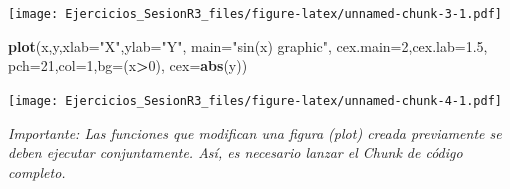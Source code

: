 \documentclass[
]{article}
\newenvironment{Shaded}{\begin{snugshade}}{\end{snugshade}}
\newcommand{\DataTypeTok}[1]{\textcolor[rgb]{0.13,0.29,0.53}{#1}}
\newcommand{\DecValTok}[1]{\textcolor[rgb]{0.00,0.00,0.81}{#1}}
\newcommand{\FloatTok}[1]{\textcolor[rgb]{0.00,0.00,0.81}{#1}}
\newcommand{\KeywordTok}[1]{\textcolor[rgb]{0.13,0.29,0.53}{\textbf{#1}}}
\newcommand{\NormalTok}[1]{#1}
\newcommand{\OperatorTok}[1]{\textcolor[rgb]{0.81,0.36,0.00}{\textbf{#1}}}
\newcommand{\StringTok}[1]{\textcolor[rgb]{0.31,0.60,0.02}{#1}}
\begin{document}
\texttt{[image: Ejercicios\_SesionR3\_files/figure-latex/unnamed-chunk-3-1.pdf]}

\begin{Shaded}
\begin{Highlighting}[]
\KeywordTok{plot}\NormalTok{(x,y,}\DataTypeTok{xlab=}\StringTok{"X"}\NormalTok{,}\DataTypeTok{ylab=}\StringTok{"Y"}\NormalTok{,}
     \DataTypeTok{main=}\StringTok{"sin(x) graphic"}\NormalTok{,}
     \DataTypeTok{cex.main=}\DecValTok{2}\NormalTok{,}\DataTypeTok{cex.lab=}\FloatTok{1.5}\NormalTok{,}
     \DataTypeTok{pch=}\DecValTok{21}\NormalTok{,}\DataTypeTok{col=}\DecValTok{1}\NormalTok{,}\DataTypeTok{bg=}\NormalTok{(x}\OperatorTok{>}\DecValTok{0}\NormalTok{),}
     \DataTypeTok{cex=}\KeywordTok{abs}\NormalTok{(y))}
\end{Highlighting}
\end{Shaded}

\texttt{[image: Ejercicios\_SesionR3\_files/figure-latex/unnamed-chunk-4-1.pdf]}

\emph{Importante: Las funciones que modifican una figura (plot) creada
previamente se deben ejecutar conjuntamente. Así, es necesario lanzar el
Chunk de código completo.}
\end{document}
